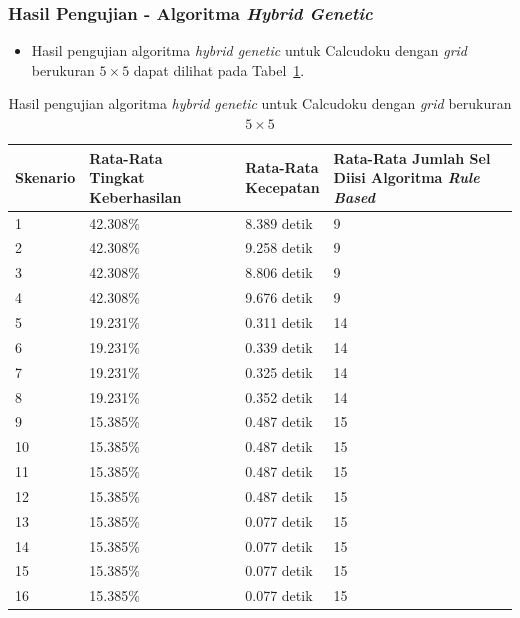 \documentclass{beamer}
\begin{document}

\begin{frame}
\frametitle{Hasil Pengujian - Algoritma \textit{Hybrid Genetic}}
\begin{itemize}
\item Hasil pengujian algoritma \textit{hybrid genetic} untuk Calcudoku dengan \textit{grid} berukuran \begin{math}5 \times 5\end{math} dapat dilihat pada Tabel~\ref{tab:pengujianhg1}.
\end{itemize}
\begin{table}
\tiny
\centering
\captionsetup{justification=centering}
\caption[Hasil pengujian algoritma \textit{hybrid genetic} untuk Calcudoku dengan \textit{grid} berukuran \begin{math}5 \times 5\end{math}]{Hasil pengujian algoritma \textit{hybrid genetic} untuk Calcudoku dengan \textit{grid} berukuran \begin{math}5 \times 5\end{math}}
\begin{tabular}{| l | l | l | l |}
\hline
Skenario & \makecell[c]{Rata-Rata \\ Tingkat Keberhasilan} & \makecell[c]{Rata-Rata \\ Kecepatan} & \makecell[c]{Rata-Rata Jumlah Sel \\ Diisi Algoritma \textit{Rule Based}} \\
\hline \hline
1& 42.308\% & 8.389 detik & 9 \\
\hline
2 & 42.308\% & 9.258 detik & 9 \\
\hline
3 & 42.308\% & 8.806 detik & 9 \\
\hline
4 & 42.308\% & 9.676 detik & 9 \\
\hline
5 & 19.231\% & 0.311 detik & 14\\
\hline
6 & 19.231\% & 0.339 detik & 14\\
\hline
7 & 19.231\% & 0.325 detik & 14 \\
\hline
8 & 19.231\% & 0.352 detik & 14 \\
\hline
9 & 15.385\% & 0.487 detik & 15 \\
\hline
10 & 15.385\% & 0.487 detik & 15 \\
\hline
11 & 15.385\% & 0.487 detik & 15 \\
\hline
12 & 15.385\% & 0.487 detik & 15 \\
\hline
13 & 15.385\% & 0.077 detik & 15 \\
\hline
14 & 15.385\% & 0.077 detik & 15 \\
\hline
15 & 15.385\% & 0.077 detik & 15 \\
\hline
16 & 15.385\% & 0.077 detik & 15 \\
\hline
\end{tabular}
\label{tab:pengujianhg1}
\end{table}
\end{frame}
\end{document}
